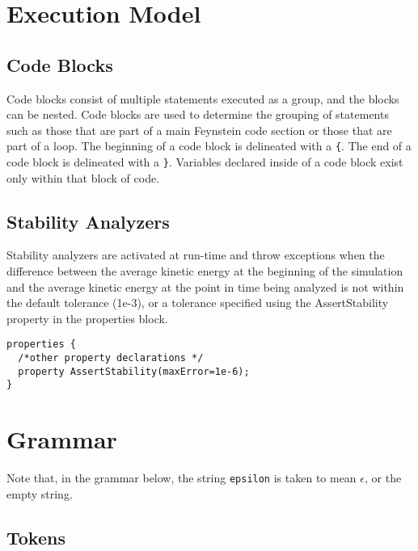 \documentclass[letterpaper]{article}
\begin{document}
\section{Execution Model}

\subsection{Code Blocks}
Code blocks consist of multiple statements executed as a group, and
the blocks can be nested. Code blocks are used to determine the
grouping of statements such as those that are part of a main Feynstein
code section or those that are part of a loop. The beginning of a code
block is delineated with a \texttt{\{}. The end of a code block is delineated
with a \texttt{\}}. Variables declared inside of a code block exist only
within that block of code.

\subsection{Stability Analyzers}

Stability analyzers are activated at run-time and throw exceptions
when the difference between the average kinetic energy at the
beginning of the simulation and the average kinetic energy at the
point in time being analyzed is not within the default tolerance
(1e-3), or a tolerance specified using the AssertStability property in
the properties block.

\begin{verbatim}
properties {
  /*other property declarations */
  property AssertStability(maxError=1e-6);
}
\end{verbatim}

\section{Grammar}

Note that, in the grammar below, the string \texttt{epsilon} is taken
to mean $\epsilon$, or the empty string.

\subsection{Tokens}
\end{document}
